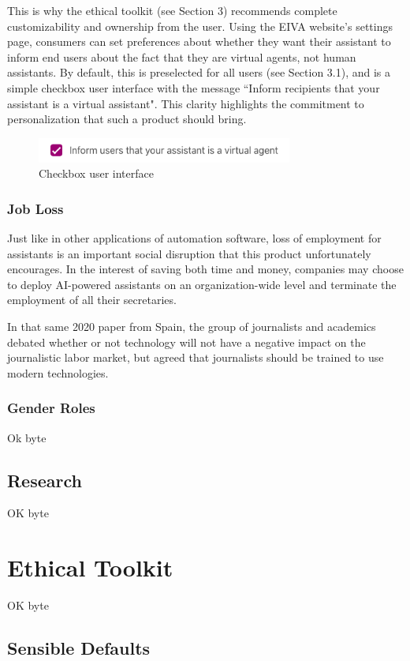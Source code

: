 \documentclass{article}
\begin{document}
This is why the ethical toolkit (see Section 3) recommends complete customizability and ownership from the user. Using the EIVA website's settings page, consumers can set preferences about whether they want their assistant to inform end users about the fact that they are virtual agents, not human assistants. By default, this is preselected for all users (see Section 3.1), and is a simple checkbox user interface with the message ``Inform recipients that your assistant is a virtual assistant". This clarity highlights the commitment to personalization that such a product should bring.

\begin{figure}[h]
 \centering
 \includegraphics[width=0.75\textwidth]{checkbox.png}
 \caption{Checkbox user interface}
 \label{fig:checkbox}
\end{figure}

\subsubsection{Job Loss}

Just like in other applications of automation software, loss of employment for assistants is an important social disruption that this product unfortunately encourages. In the interest of saving both time and money, companies may choose to deploy AI-powered assistants on an organization-wide level and terminate the employment of all their secretaries.

In that same 2020 paper from Spain, the group of journalists and academics debated whether or not technology will not have a negative impact on the journalistic labor market, but agreed that journalists should be trained to use modern technologies.

\subsubsection{Gender Roles}

Ok byte

\subsection{Research}

OK byte

\section{Ethical Toolkit}

OK byte

\subsection{Sensible Defaults}

\listoffigures
\end{document}
